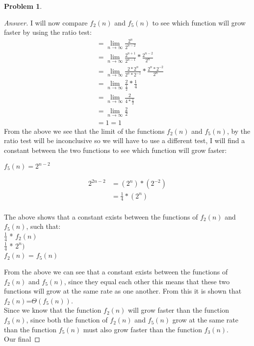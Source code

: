 \documentclass[11pt]{article}
\theoremstyle{definition}
\theoremstyle{definition}
\newtheorem{required}{Problem}
\theoremstyle{definition}
\begin{document}
\begin{required}
\begin{enumerate}[label=(\alph*)]
\begin{proof}[Answer]
I will now compare $f_2(n)$ and $f_5(n)$ to see which function will grow faster by using the ratio test: \\
\begin{align*}
&= \lim_{n \to \infty} \frac{2^n}{2^{n-2}} \\
&= \lim_{n \to \infty} \frac{2^{n+1}}{2^{n-1}} * \frac{2^{n-2}}{2^{n}} \\
&= \lim_{n \to \infty} \frac{2*2^{n}}{2^{n}*2^{-1}} * \frac{2^{n}*2^{-2}}{2^{n}} \\
&= \lim_{n \to \infty} \frac{2}{\frac{1}{2}} * \frac{1}{4}\\
&= \lim_{n \to \infty} \frac{2}{4*\frac{1}{2}} \\
&= \lim_{n \to \infty} \frac{2}{2} \\
&= 1 = 1
\end{align*}
From the above we see that the limit of the functions $f_2(n)$ and $f_5(n)$, by the ratio test will be inconclusive so we will have to use a different test, I will find a constant between the two functions to see which function will grow faster: \\
\begin{center}
$f_5(n) = 2^{n-2} $
\end{center} 
\begin{align*}
2^{2n-2} &= (2^n) * (2^{-2}) \\
&= \frac{1}{4} * (2^n) \\
\end{align*}
\begin{center}
The above shows that a constant exists between the functions of $f_2(n)$ and $f_5(n)$, such that: \\
$\frac{1}{4}$ * $f_2(n)$ \\
$\frac{1}{4}$ * $2^{n})$ \\
$f_2(n)$ = $f_5(n)$ \\
\end{center}
From the above we can see that a constant exists between the functions of $f_2(n)$ and $f_5(n)$, since they equal each other this means that these two functions will grow at the same rate as one another. From this it is shown that  $f_2(n)$=$\Theta(f_5(n))$. \\

Since we know that the function  $f_2(n)$ will grow faster than the function $f_3(n)$, since both the function of  $f_2(n)$ and $f_5(n)$ grow at the same rate than the function $f_5(n)$ must also grow faster than the function $f_3(n)$. \\

Our final 
\end{proof}
\end{enumerate}

\end{required}
\end{document}
